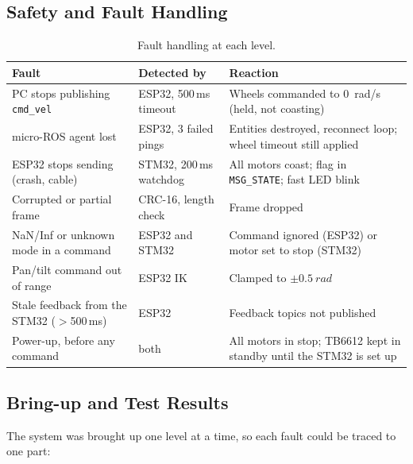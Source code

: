 \documentclass[12pt,a4paper]{article}
\begin{document}
\subsection{Safety and Fault Handling}

\begin{table}[H]
\centering
\caption{Fault handling at each level.}
\label{pr3:tab:safety}
\small
\begin{tabularx}{\linewidth}{l l >{\raggedright\arraybackslash}X}
\toprule
Fault & Detected by & Reaction \\
\midrule
PC stops publishing \texttt{cmd\_vel}       & ESP32, 500\,ms timeout & Wheels commanded to \SI{0}{rad/s} (held, not coasting) \\
micro-ROS agent lost                      & ESP32, 3 failed pings  & Entities destroyed, reconnect loop; wheel timeout still applied \\
ESP32 stops sending (crash, cable)        & STM32, 200\,ms watchdog & All motors coast; flag in \texttt{MSG\_STATE}; fast LED blink \\
Corrupted or partial frame                & CRC-16, length check   & Frame dropped \\
NaN/Inf or unknown mode in a command      & ESP32 and STM32        & Command ignored (ESP32) or motor set to stop (STM32) \\
Pan/tilt command out of range             & ESP32 IK               & Clamped to $\pm\SI{0.5}{rad}$ \\
Stale feedback from the STM32 ($>$500\,ms)& ESP32                  & Feedback topics not published \\
Power-up, before any command              & both                   & All motors in stop; TB6612 kept in standby until the STM32 is set up \\
\bottomrule
\end{tabularx}
\end{table}

\subsection{Bring-up and Test Results}
\label{pr3:sec:test}

The system was brought up one level at a time, so each fault could be traced to one part:
\end{document}
